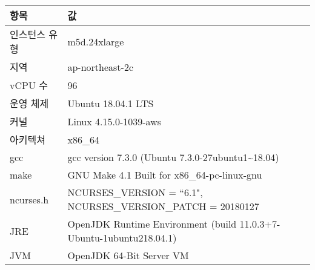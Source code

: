 \begin{tabularx}{\linewidth}{l|X}
    항목 & 값 \\
    \hline
    인스턴스 유형 & m5d.24xlarge \\
    지역 & ap-northeast-2c \\
    vCPU 수 & 96 \\
    \hline
    운영 체제 & Ubuntu 18.04.1 LTS \\
    커널 & Linux 4.15.0-1039-aws \\
    아키텍쳐 & x86_64 \\
    \hline
    gcc & gcc version 7.3.0 (Ubuntu 7.3.0-27ubuntu1\textasciitilde{}18.04) \\
    make & GNU Make 4.1 Built for x86_64-pc-linux-gnu \\
    ncurses.h & NCURSES_VERSION = ``6.1", NCURSES_VERSION_PATCH = 20180127 \\
    \hline
    JRE & OpenJDK Runtime Environment (build 11.0.3+7-Ubuntu-1ubuntu218.04.1) \\
    JVM & OpenJDK 64-Bit Server VM \\
\end{tabularx}
